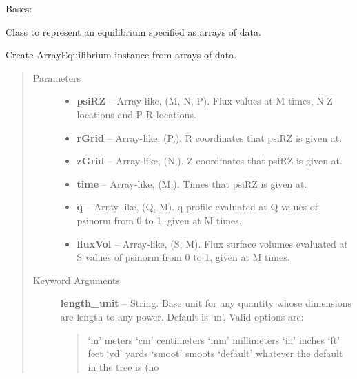 \documentclass[letterpaper,10pt,english]{sphinxmanual}
\begin{document}
\begin{fulllineitems}
\label{eqtools:eqtools.FromArrays.ArrayEquilibrium}
Bases: {\hyperref[eqtools:eqtools.core.Equilibrium]{}}

Class to represent an equilibrium specified as arrays of data.

Create ArrayEquilibrium instance from arrays of data.
\begin{quote}\begin{description}
\item[{Parameters }] \leavevmode\begin{itemize}
\item {} 
\textbf{psiRZ} --
Array-like, (M, N, P). Flux values at M times, N Z locations
and P R locations.

\item {} 
\textbf{rGrid} --
Array-like, (P,). R coordinates that psiRZ is given at.

\item {} 
\textbf{zGrid} --
Array-like, (N,). Z coordinates that psiRZ is given at.

\item {} 
\textbf{time} --
Array-like, (M,). Times that psiRZ is given at.

\item {} 
\textbf{q} --
Array-like, (Q, M). q profile evaluated at Q values of psinorm
from 0 to 1, given at M times.

\item {} 
\textbf{fluxVol} --
Array-like, (S, M). Flux surface volumes evaluated at S
values of psinorm from 0 to 1, given at M times.

\end{itemize}

\item[{Keyword Arguments}] \leavevmode
\textbf{length\_unit} --
String. Base unit for any quantity whose dimensions
are length to any power. Default is `m'. Valid options are:
\begin{quote}

`m'         meters
`cm'        centimeters
`mm'        millimeters
`in'        inches
`ft'        feet
`yd'        yards
`smoot'     smoots
`default'   whatever the default in the tree is (no
\begin{quote}


\end{quote}
\end{quote}
\end{description}
\end{quote}
\end{fulllineitems}
\end{document}
